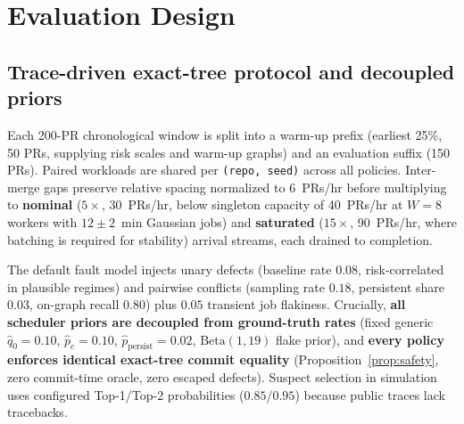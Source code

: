 \section{Evaluation Design}
\label{sec:eval_setup}
\subsection{Trace-driven exact-tree protocol and decoupled priors}
Each 200-PR chronological window is split into a warm-up prefix (earliest 25\%, 50 PRs, supplying risk scales and warm-up graphs) and an evaluation suffix (150 PRs). Paired workloads are shared per \texttt{(repo, seed)} across all policies. Inter-merge gaps preserve relative spacing normalized to 6~PRs/hr before multiplying to \textbf{nominal} ($5\times$, 30~PRs/hr, below singleton capacity of 40~PRs/hr at $W{=}8$ workers with $12\pm 2$~min Gaussian jobs) and \textbf{saturated} ($15\times$, 90~PRs/hr, where batching is required for stability) arrival streams, each drained to completion.

The default fault model injects unary defects (baseline rate $0.08$, risk-correlated in plausible regimes) and pairwise conflicts (sampling rate $0.18$, persistent share $0.03$, on-graph recall $0.80$) plus $0.05$ transient job flakiness. Crucially, \textbf{all scheduler priors are decoupled from ground-truth rates} (fixed generic $\hat{q}_0{=}0.10$, $\hat{p}_c{=}0.10$, $\hat{p}_{\text{persist}}{=}0.02$, $\mathrm{Beta}(1,19)$ flake prior), and \textbf{every policy enforces identical exact-tree commit equality} (Proposition~\ref{prop:safety}, zero commit-time oracle, zero escaped defects). Suspect selection in simulation uses configured Top-1/Top-2 probabilities ($0.85$/$0.95$) because public traces lack tracebacks.


